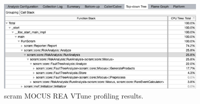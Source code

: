\begin{figure}[H]
    \centering
    \includegraphics[width=0.9\textwidth]{3_identifying_gaps/benchmarking/profiling_methods/figures/vtune_scram_mocus_rea.png}
    \caption{scram MOCUS REA VTune profiling results.}
    \label{fig:vtune_scram_mocus_rea}
\end{figure}